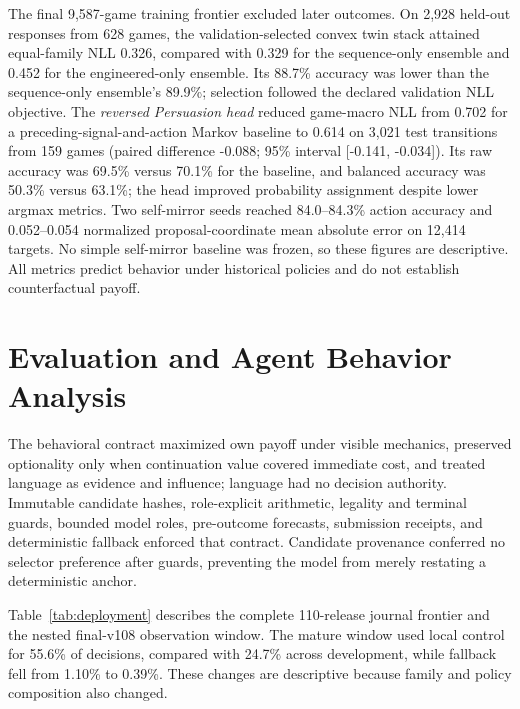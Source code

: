 \documentclass{article}
\begin{document}
The final 9,587-game training frontier excluded later outcomes. On 2,928 held-out responses from 628 games, the validation-selected convex twin stack attained equal-family NLL 0.326, compared with 0.329 for the sequence-only ensemble and 0.452 for the engineered-only ensemble. Its 88.7\% accuracy was lower than the sequence-only ensemble's 89.9\%; selection followed the declared validation NLL objective. The \emph{reversed Persuasion head} reduced game-macro NLL from 0.702 for a preceding-signal-and-action Markov baseline to 0.614 on 3,021 test transitions from 159 games (paired difference -0.088; 95\% interval [-0.141, -0.034]). Its raw accuracy was 69.5\% versus 70.1\% for the baseline, and balanced accuracy was 50.3\% versus 63.1\%; the head improved probability assignment despite lower argmax metrics. Two self-mirror seeds reached 84.0--84.3\% action accuracy and 0.052--0.054 normalized proposal-coordinate mean absolute error on 12,414 targets. No simple self-mirror baseline was frozen, so these figures are descriptive. All metrics predict behavior under historical policies and do not establish counterfactual payoff.

\section{Evaluation and Agent Behavior Analysis}

The behavioral contract maximized own payoff under visible mechanics, preserved optionality only when continuation value covered immediate cost, and treated language as evidence and influence; language had no decision authority. Immutable candidate hashes, role-explicit arithmetic, legality and terminal guards, bounded model roles, pre-outcome forecasts, submission receipts, and deterministic fallback enforced that contract. Candidate provenance conferred no selector preference after guards, preventing the model from merely restating a deterministic anchor.

Table~\ref{tab:deployment} describes the complete 110-release journal frontier and the nested final-v108 observation window. The mature window used local control for 55.6\% of decisions, compared with 24.7\% across development, while fallback fell from 1.10\% to 0.39\%. These changes are descriptive because family and policy composition also changed.
\end{document}
